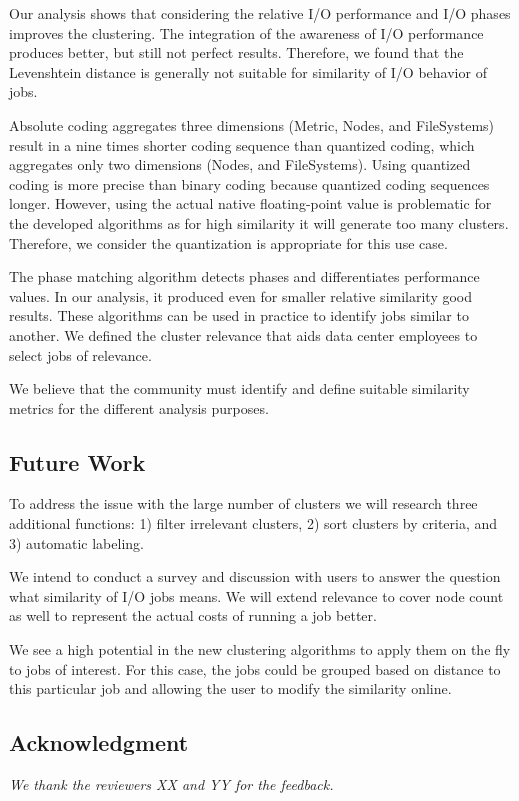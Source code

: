 \documentclass{jhps}
\begin{document}
{{{{Our analysis shows that considering the relative I/O performance and I/O phases improves the clustering.
The integration of the awareness of I/O performance produces better, but still not perfect results.
Therefore, we found that the Levenshtein distance is generally not suitable for similarity of I/O behavior of jobs.

Absolute coding aggregates three dimensions (Metric, Nodes, and FileSystems) result in a nine times shorter coding sequence than quantized coding, which aggregates only two dimensions (Nodes, and FileSystems).
Using quantized coding is more precise than binary coding because quantized coding sequences longer.
However, using the actual native floating-point value is problematic for the developed algorithms as for high similarity it will generate too many clusters.
Therefore, we consider the quantization is appropriate for this use case.

The phase matching algorithm detects phases and differentiates performance values.
In our analysis, it produced even for smaller relative similarity good results.
These algorithms can be used in practice to identify jobs similar to another.
We defined the cluster relevance that aids data center employees to select jobs of relevance.

We believe that the community must identify and define suitable similarity metrics for the different analysis purposes.


\subsection{Future Work}
To address the issue with the large number of clusters we will research three additional functions: 1) filter irrelevant clusters, 2) sort clusters by criteria, and 3) automatic labeling.

We intend to conduct a survey and discussion with users to answer the question what similarity of I/O jobs means.
We will extend relevance to cover node count as well to represent the actual costs of running a job better.

We see a high potential in the new clustering algorithms to apply them on the fly to jobs of interest.
For this case, the jobs could be grouped based on distance to this particular job and allowing the user to modify the similarity online.


\subsection*{Acknowledgment} %
\textit{We thank the reviewers XX and YY for the feedback.}

}}}}
\end{document}
